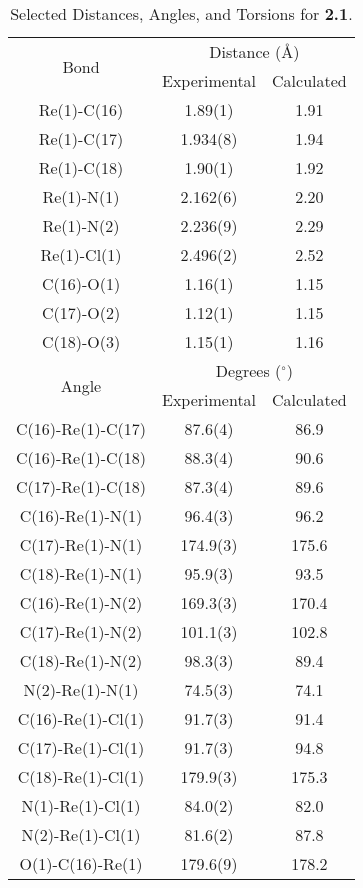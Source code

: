 \begin{table}[htb]
  \caption{Selected Distances, Angles, and Torsions for \textbf{2.1}.}
  \centering
    \begin{tabular}{ccc}
    \toprule
    \multirow{2}{*}{Bond} & \multicolumn{2}{c}{Distance (\r{A})} \\ \cline{2-3}
     & Experimental & Calculated \\ \midrule
    Re(1)-C(16) & 1.89(1) & 1.91 \\
    Re(1)-C(17) & 1.934(8) & 1.94 \\
    Re(1)-C(18) & 1.90(1) & 1.92 \\
    Re(1)-N(1) & 2.162(6) & 2.20 \\
    Re(1)-N(2) & 2.236(9) & 2.29 \\
    Re(1)-Cl(1) & 2.496(2) & 2.52 \\ 
    C(16)-O(1) & 1.16(1) & 1.15 \\
    C(17)-O(2) & 1.12(1) & 1.15 \\
    C(18)-O(3) & 1.15(1) & 1.16 \\ \midrule
    \multirow{2}{*}{Angle} & \multicolumn{2}{c}{Degrees ($^\circ$)} \\ \cline{2-3}
     & Experimental & Calculated \\ \midrule
    C(16)-Re(1)-C(17) & 87.6(4) & 86.9 \\
    C(16)-Re(1)-C(18) & 88.3(4) & 90.6 \\
    C(17)-Re(1)-C(18) & 87.3(4) & 89.6 \\
    C(16)-Re(1)-N(1) & 96.4(3) & 96.2 \\
    C(17)-Re(1)-N(1) & 174.9(3) & 175.6 \\
    C(18)-Re(1)-N(1) & 95.9(3) & 93.5 \\
    C(16)-Re(1)-N(2) & 169.3(3) & 170.4 \\
    C(17)-Re(1)-N(2) & 101.1(3) & 102.8 \\
    C(18)-Re(1)-N(2) & 98.3(3) & 89.4 \\
    N(2)-Re(1)-N(1) & 74.5(3) & 74.1 \\
    C(16)-Re(1)-Cl(1) & 91.7(3) & 91.4 \\
    C(17)-Re(1)-Cl(1) & 91.7(3) & 94.8 \\
    C(18)-Re(1)-Cl(1) & 179.9(3) & 175.3 \\
    N(1)-Re(1)-Cl(1) & 84.0(2) & 82.0 \\
    N(2)-Re(1)-Cl(1) & 81.6(2) & 87.8 \\
    O(1)-C(16)-Re(1) & 179.6(9) & 178.2 \\

\end{tabular}
\end{table}
